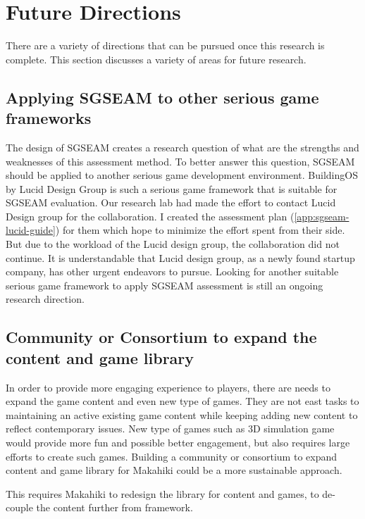 \section{Future Directions}

There are a variety of directions that can be pursued once this research is complete. This section discusses a variety of areas for future research.

\subsection{Applying SGSEAM to other serious game frameworks}
\label{future:other-framework}

The design of SGSEAM creates a research question of what are the strengths and weaknesses of this assessment method. To better answer this question, SGSEAM should be applied to another serious game development environment. BuildingOS\cite{building-dashboard} by Lucid Design Group is such a serious game framework that is suitable for SGSEAM evaluation. Our research lab had made the effort to contact Lucid Design group for the collaboration. I created the assessment plan (\autoref{app:sgseam-lucid-guide}) for them which hope to minimize the effort spent from their side. But due to the workload of the Lucid design group, the collaboration did not continue. It is understandable that Lucid design group, as a newly found startup company, has other urgent endeavors to pursue. Looking for another suitable serious game framework to apply SGSEAM assessment is still an ongoing research direction.

\subsection{Community or Consortium to expand the content and game library}

In order to provide more engaging experience to players, there are needs to expand the game content and even new type of games. They are not east tasks to maintaining an active existing game content while keeping adding new content to reflect contemporary issues. New type of games such as 3D simulation game would provide more fun and possible better engagement, but also requires large efforts to create such games. Building a community or consortium to expand content and game library for Makahiki could be a more sustainable approach. 

This requires Makahiki to redesign the library for content and games, to de-couple  the content further from framework.


